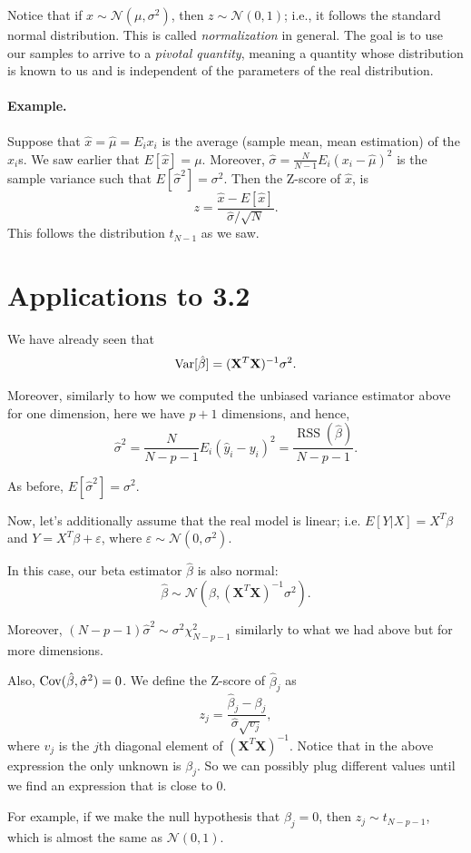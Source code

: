 \documentclass[11pt]{article}
\theoremstyle{definition}
\newcommand{\XX}{\mathbf{X}}
\newcommand{\Normal}[2]{\ensuremath{\mathcal N (#1, #2)}}
\DeclareMathOperator*{\RSS}{RSS} \DeclareMathOperator*{\WRSS}{WRSS}
\begin{document}
Notice that if $x\sim\Normal{\mu}{\sigma^2}$, then $z\sim\Normal 0 1$; i.e., it
follows the standard normal distribution. This is called \emph{normalization} in
general. The goal is to use our samples to arrive to a \emph{pivotal quantity},
meaning a quantity whose distribution is known to us and is independent of the
parameters of the real distribution.

\paragraph{Example.} Suppose that $\hat x=\hat\mu=E_i x_i$ is the average (sample mean,
mean estimation) of the $x_i$s. We saw earlier that $E[\hat{x}]=\mu$. Moreover,
$\hat\sigma=\frac{N}{N-1}E_i(x_i-\hat\mu)^2$ is the sample variance such that
$E[\hat\sigma^2]=\sigma^2$. Then the Z-score of $\hat x$, is
\[z=\frac{\hat x-E[\hat x]}{\hat\sigma/\sqrt{N}}.\]
This follows the distribution $t_{N-1}$ as we saw.

\section{Applications to 3.2}
We have already seen that
\[\Var[\hat\beta]=(\XX^T\XX)^{-1}\sigma^2.\]

Moreover, similarly to how we computed the unbiased variance estimator above for
one dimension, here we have $p+1$ dimensions, and hence,
\[\hat\sigma^2=\frac{N}{N-p-1}E_i(\hat y_i-y_i)^2 = \frac{\RSS(\hat\beta)}{N-p-1}.\]

As before, $E[\hat\sigma^2]=\sigma^2$.

Now, let's additionally assume that the real model is linear; i.e.
$E[Y|X]=X^T\beta$ and $Y=X^T\beta+\varepsilon$, where
$\varepsilon\sim\Normal{0}{\sigma^2}$.

In this case, our beta estimator $\hat\beta$ is also normal:
\[\hat\beta\sim\Normal{\beta}{(\XX^T\XX)^{-1}\sigma^2}.\]

Moreover, $(N-p-1)\hat\sigma^2\sim\sigma^2\chi^2_{N-p-1}$ similarly to what we
had above but for more dimensions.

Also, $\operatorname*{Cov}(\hat\beta,\hat\sigma^2)=0$. We define the Z-score of $\hat\beta_j$
as
\[z_j=\frac{\hat\beta_j-\beta_j}{\hat\sigma\sqrt{v_j}},\] where $v_j$ is the
$j$th diagonal element of $(\XX^T\XX)^{-1}$. Notice that in the above expression
the only unknown is $\beta_j$. So we can possibly plug different values until we
find an expression that is close to 0.

For example, if we make the null hypothesis that $\beta_j=0$, then $z_j\sim
	t_{N-p-1}$, which is almost the same as $\Normal 0 1$.
\end{document}
